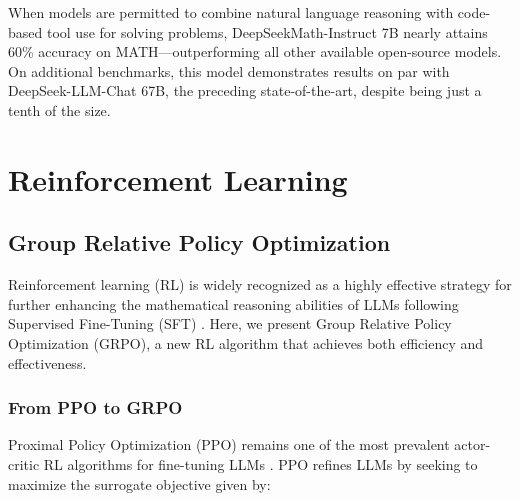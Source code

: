 When models are permitted to combine natural language reasoning with code-based tool use for solving problems, DeepSeekMath-Instruct 7B nearly attains 60\% accuracy on MATH—outperforming all other available open-source models. On additional benchmarks, this model demonstrates results on par with DeepSeek-LLM-Chat 67B, the preceding state-of-the-art, despite being just a tenth of the size.

\section{Reinforcement Learning}

\subsection{Group Relative Policy Optimization}
Reinforcement learning (RL) is widely recognized as a highly effective strategy for further enhancing the mathematical reasoning abilities of LLMs following Supervised Fine-Tuning (SFT) \citep{wang2023math,wizardmath}. Here, we present Group Relative Policy Optimization (GRPO), a new RL algorithm that achieves both efficiency and effectiveness.

\subsubsection{From PPO to GRPO} Proximal Policy Optimization (PPO) \citep{schulman2017proximal} remains one of the most prevalent actor-critic RL algorithms for fine-tuning LLMs \citep{ouyang2022training}. PPO refines LLMs by seeking to maximize the surrogate objective given by:


